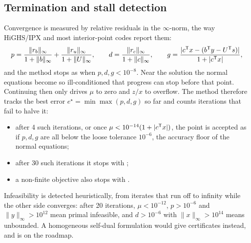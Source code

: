 \subsection{Termination and stall detection}
Convergence is measured by relative residuals in the $\infty$-norm, the way HiGHS/IPX and most
interior-point codes report them:
\begin{equation}\label{eq:ipm-term}
  p = \frac{\|r_b\|_\infty}{1+\|b\|_\infty}+\frac{\|r_u\|_\infty}{1+\|U\|_\infty},\qquad
  d = \frac{\|r_c\|_\infty}{1+\|c\|_\infty},\qquad
  g = \frac{|c^{\mathsf{T}} x - (b^{\mathsf{T}} y - U^{\mathsf{T}} s)|}{1+|c^{\mathsf{T}} x|},
\end{equation}
and the method stops as  when $p,d,g<10^{-8}$. Near the solution the normal
equations become so ill-conditioned that progress can stop before that point. Continuing then only
drives $\mu$ to zero and $z/x$ to overflow. The method therefore tracks the best error
$e^\star=\min\max(p,d,g)$ so far and counts iterations that fail to halve it:
\begin{itemize}
  \item after 4 such iterations, or once $\mu<10^{-14}(1+|c^{\mathsf{T}} x|)$, the point is accepted as
         if $p,d,g$ are all below the loose tolerance $10^{-6}$, the accuracy floor
        of the normal equations;
  \item after 30 such iterations it stops with ;
  \item a non-finite objective also stops with .
\end{itemize}
Infeasibility is detected heuristically, from iterates that run off to infinity while the other side
converges: after 20 iterations, $\mu<10^{-12}$, $p>10^{-6}$ and $\|y\|_\infty>10^{12}$ mean primal
infeasible, and $d>10^{-6}$ with $\|x\|_\infty>10^{14}$ means unbounded. A homogeneous self-dual
formulation would give certificates instead, and is on the roadmap.

